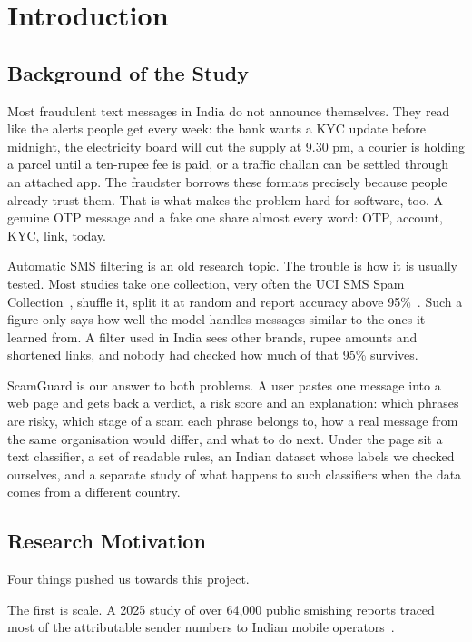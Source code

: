 \chapter{Introduction}

\section{Background of the Study}
Most fraudulent text messages in India do not announce themselves. They read like the alerts people get every week: the bank wants a KYC update before midnight, the electricity board will cut the supply at 9.30 pm, a courier is holding a parcel until a ten-rupee fee is paid, or a traffic challan can be settled through an attached app. The fraudster borrows these formats precisely because people already trust them. That is what makes the problem hard for software, too. A genuine OTP message and a fake one share almost every word: OTP, account, KYC, link, today.

Automatic SMS filtering is an old research topic. The trouble is how it is usually tested. Most studies take one collection, very often the UCI SMS Spam Collection~\cite{almeida2011contributions}, shuffle it, split it at random and report accuracy above 95\%~\cite{almeida2013towards,roy2020deep}. Such a figure only says how well the model handles messages similar to the ones it learned from. A filter used in India sees other brands, rupee amounts and shortened links, and nobody had checked how much of that 95\% survives.

ScamGuard is our answer to both problems. A user pastes one message into a web page and gets back a verdict, a risk score and an explanation: which phrases are risky, which stage of a scam each phrase belongs to, how a real message from the same organisation would differ, and what to do next. Under the page sit a text classifier, a set of readable rules, an Indian dataset whose labels we checked ourselves, and a separate study of what happens to such classifiers when the data comes from a different country.

\section{Research Motivation}
Four things pushed us towards this project.

The first is scale. A 2025 study of over 64,000 public smishing reports traced most of the attributable sender numbers to Indian mobile operators~\cite{agarwal2025fishing}.

